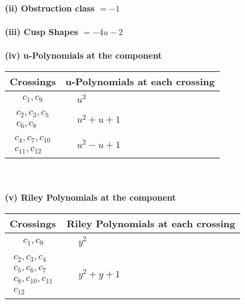 \documentclass[1p]{elsarticle_modified}
\theoremstyle{definition}
\begin{document}
\flushleft \textbf{(ii) Obstruction class $= -1$}\\~\\
\flushleft \textbf{(iii) Cusp Shapes $= -4 u-2$}\\~\\
\newpage\renewcommand{\arraystretch}{1}
\flushleft \textbf{(iv) u-Polynomials at the component}\newline \\
\begin{tabular}{m{50pt}|m{274pt}}
Crossings & \hspace{64pt}u-Polynomials at each crossing \\
\hline $$\begin{aligned}c_{1},c_{9}\end{aligned}$$&$\begin{aligned}
&u^2
\end{aligned}$\\
\hline $$\begin{aligned}c_{2},c_{3},c_{5}\\c_{6},c_{8}\end{aligned}$$&$\begin{aligned}
&u^2+u+1
\end{aligned}$\\
\hline $$\begin{aligned}c_{4},c_{7},c_{10}\\c_{11},c_{12}\end{aligned}$$&$\begin{aligned}
&u^2- u+1
\end{aligned}$\\
\hline
\end{tabular}\\~\\
\newpage\renewcommand{\arraystretch}{1}
\flushleft \textbf{(v) Riley Polynomials at the component}\newline \\
\begin{tabular}{m{50pt}|m{274pt}}
Crossings & \hspace{64pt}Riley Polynomials at each crossing \\
\hline $$\begin{aligned}c_{1},c_{9}\end{aligned}$$&$\begin{aligned}
&y^2
\end{aligned}$\\
\hline $$\begin{aligned}c_{2},c_{3},c_{4}\\c_{5},c_{6},c_{7}\\c_{8},c_{10},c_{11}\\c_{12}\end{aligned}$$&$\begin{aligned}
&y^2+y+1
\end{aligned}$\\
\hline
\end{tabular}\\~\\
\end{document}
